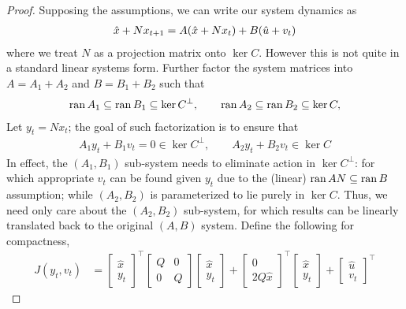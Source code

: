 \documentclass[12pt]{article}
\begin{document}
\begin{proof}
  Supposing the assumptions, we can write our system dynamics as
  \begin{align*}
    \hat{x} + N x_{t + 1}
      = A {\left(\hat{x} + N x_t\right)} + B {\left(\hat{u} + v_t\right)}
  \end{align*}
  where we treat \(N\) as a projection matrix onto \(\ker C\).
  However this is not quite in a standard linear systems form.
  Further factor the system matrices into
  \(A = A_1 + A_2\) and \(B = B_1 + B_2\) such that
  \begin{align*}
    \operatorname{ran} A_1 \subseteq \operatorname{ran} B_1 \subseteq \operatorname{ker} C^\perp,
      \qquad \operatorname{ran} A_2 \subseteq \operatorname{ran} B_2 \subseteq \operatorname{ker} C,
  \end{align*}
  Let \(y_t = N x_t\); the goal of such factorization is to ensure that
  \begin{align*}
    A_1 y_t + B_1 v_t = 0 \in \ker C^\perp,
      \qquad
      A_2 y_t + B_2 v_t \in \ker C
  \end{align*}
  In effect, the \((A_1, B_1)\) sub-system needs to eliminate
  action in \(\ker C^\perp\):
  for which appropriate \(v_t\) can be found given \(y_t\)
  due to the (linear) \(\operatorname{ran} AN \subseteq \operatorname{ran} B\) assumption;
  while \((A_2, B_2)\) is parameterized to lie purely in \(\ker C\).
  Thus, we need only care about the \((A_2, B_2)\) sub-system,
  for which results can be linearly translated back to the
  original \((A, B)\) system.
  Define the following for compactness,
  \begin{align*}
    J(y_t, v_t)
      &= \begin{bmatrix} \hat{x} \\ y_t \end{bmatrix}^\top
        \begin{bmatrix} Q & 0 \\ 0 & Q \end{bmatrix}
        \begin{bmatrix} \hat{x} \\ y_t \end{bmatrix}
        + \begin{bmatrix} 0 \\ 2 Q \hat{x} \end{bmatrix}^\top
          \begin{bmatrix} \hat{x} \\ y_t \end{bmatrix}
        + \begin{bmatrix} \hat{u} \\ v_t \end{bmatrix}^\top

\end{align*}
\end{proof}
\end{document}
